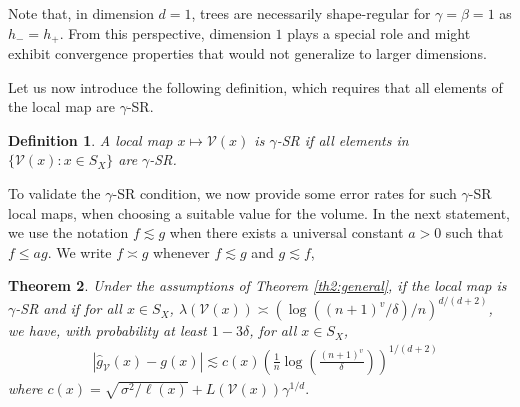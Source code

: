\documentclass[paper=a4, fontsize=11pt]{scrartcl}
\newtheorem{theorem}{Theorem}
\newtheorem{definition}[theorem]{Definition}
\begin{document}
Note that, in dimension $d=1$, trees are necessarily shape-regular for $\gamma=\beta=1$ as $ h_- = h_+$. From this perspective, dimension $1$ plays a special role and might exhibit convergence properties that would not generalize to larger dimensions.






Let us now introduce the following definition, which requires that all elements of the local map are $\gamma $-SR. 

\begin{definition}
A local map $x\mapsto  \mathcal V (x)$ is $\gamma$-SR  if all elements in \hbox{$\{\mathcal V (x) : x\in S_X\}$} are $\gamma$-SR. 
\end{definition}

To validate the $\gamma$-SR condition, we now provide some error rates for such $\gamma$-SR local maps, when choosing a suitable value for the volume. In the next statement, we use the notation
$ f \lesssim g $ when there exists a universal constant $ a >0$ such that 
$   f  \leq a  g .$
We write $ f \asymp g $ whenever $f\lesssim g $ and $g\lesssim f$, 

\begin{theorem}\label{main_result_localizing_map}   
Under the assumptions of Theorem \ref{th2:general}, if the local map is $\gamma$-SR and if for all $x\in S_X$,
$\lambda(\mathcal V(x) ) \asymp ({\log ( {(n+1)^v} / { \delta} ) } / { n} )  ^{d/(d+2)}$, we have, with probability at least $1 - 3\delta $, for all $x\in S_X$,
    \begin{align*}
        & | \hat g_{\mathcal V}(x) - g(x)| \lesssim c(x) \left(\frac{1 }{ n}\log\left( \frac{(n+1)^v}{ \delta} \right) \right) ^{1/(d+2)}
    \end{align*}
     where $c(x) = \sqrt{{ \, \sigma^2}/\ell(x)} +  L(\mathcal V(x) )  \gamma^{1/d}.$ 
    \end{theorem}
\end{document}
